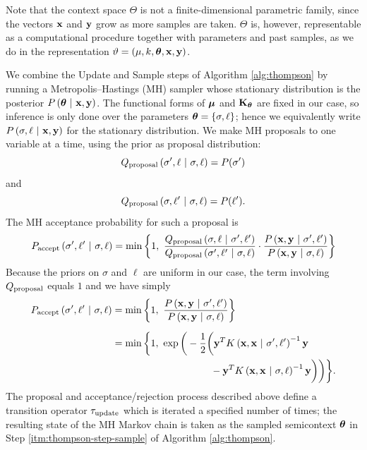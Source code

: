 Note that the context space $\Theta$ is not a finite-dimensional parametric
family, since the vectors $\mathbf{x}$ and $\mathbf{y}$ grow as more samples are
taken.  $\Theta$ is, however, representable as a computational
procedure together with parameters and past samples, as we do in the
representation $\vartheta = (\mu, k, \bm{\theta}, \mathbf{x}, \mathbf{y})$.

We combine the Update and Sample steps of Algorithm \ref{alg:thompson} by
running a Metropolis--Hastings (MH) sampler whose stationary distribution is the
posterior $P\left( \bm{\theta} \ \middle\vert\  \mathbf{x}, \mathbf{y} \right)$.  The functional forms of
$\bm{\mu}$ and $\mathbf{K}_{\bm{\theta}}$ are fixed in our case, so inference is only done
over the parameters $\bm{\theta} = \left\{ \sigma,\ell \right\}$; hence we equivalently write
$P\left( \sigma,\ell \ \middle\vert\  \mathbf{x}, \mathbf{y} \right)$ for the stationary
distribution.  We make MH proposals to one variable at a time, using the prior
as proposal distribution:
\[
  Q_{\textrm{proposal}}\left( \sigma',\ell \ \middle\vert\  \sigma,\ell \right) = P(\sigma')
\]
and
\[
  Q_{\textrm{proposal}}\left( \sigma,\ell' \ \middle\vert\  \sigma,\ell \right) = P(\ell').
\]
The MH acceptance probability for such a proposal is
\[
  P_{\textrm{accept}}\left( \sigma',\ell' \ \middle\vert\  \sigma,\ell \right)
  =
  \min\left\{ 1,\ \frac{
    Q_{\textrm{proposal}}\left( \sigma,\ell \ \middle\vert\  \sigma',\ell' \right)
    }{
    Q_{\textrm{proposal}}\left( \sigma',\ell' \ \middle\vert\  \sigma,\ell \right)
    }
  \cdot
  \frac{
    P\left( \mathbf{x},\mathbf{y} \ \middle\vert\  \sigma',\ell' \right)
    }{
    P\left( \mathbf{x},\mathbf{y} \ \middle\vert\  \sigma,\ell \right)
    } \right\}
\]
Because the priors on $\sigma$ and $\ell$ are uniform in our case, the term
involving $Q_{\textrm{proposal}}$ equals $1$ and we have simply
\begin{align*}
  P_{\textrm{accept}}\left( \sigma',\ell' \ \middle\vert\  \sigma,\ell \right)
  &=
  \min\left\{ 1,\ \frac{
    P\left( \mathbf{x},\mathbf{y} \ \middle\vert\  \sigma',\ell' \right)
    }{
    P\left( \mathbf{x},\mathbf{y} \ \middle\vert\  \sigma,\ell \right)
    } \right\} \\[2mm]
  &=
  \min\bigg\{1,\ \exp\bigg( -\frac12\bigg(
    \mathbf{y}^T K \left( \mathbf{x}, \mathbf{x} \ \middle\vert\  \sigma', \ell' \right)^{-1} \mathbf{y} \\
  & \qquad\qquad\qquad\qquad\qquad -
    \mathbf{y}^T K \left( \mathbf{x}, \mathbf{x} \ \middle\vert\  \sigma, \ell \right)^{-1} \mathbf{y}
  \bigg)\bigg)\bigg\}.
\end{align*}
The proposal and acceptance/rejection process described above define a
transition operator $\tau_{\textrm{update}}$ which is iterated a specified number of
times; the resulting state of the MH Markov chain is taken as the sampled
semicontext $\bm{\theta}$ in Step \ref{itm:thompson-step-sample} of Algorithm
\ref{alg:thompson}.

